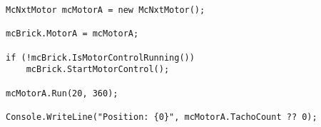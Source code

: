 \begin{lstlisting}[style=csharpsmall,caption={Et eksempel på brug af MotorControl},label=mindsqualls:motorcontrol]
McNxtMotor mcMotorA = new McNxtMotor();

mcBrick.MotorA = mcMotorA;

if (!mcBrick.IsMotorControlRunning())
    mcBrick.StartMotorControl();

mcMotorA.Run(20, 360);

Console.WriteLine("Position: {0}", mcMotorA.TachoCount ?? 0);
\end{lstlisting}

